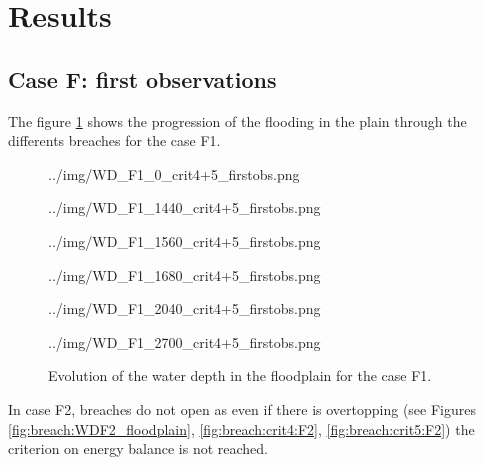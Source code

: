 \section{Results}
\subsection{Case F: first observations}
The figure \ref{fig:breach:WDF1_floodplain} shows the progression of the flooding
in the plain through the differents breaches for the case F1.
\begin{figure}[H]
\begin{minipage}[t]{0.5\textwidth}
  \centering
  {../img/WD_F1_0_crit4+5_firstobs.png}
\end{minipage}
\begin{minipage}[t]{0.5\textwidth}
  \centering
  {../img/WD_F1_1440_crit4+5_firstobs.png}\\
\end{minipage}
\begin{minipage}[t]{0.5\textwidth}
  \centering
  {../img/WD_F1_1560_crit4+5_firstobs.png}\\
\end{minipage}
\begin{minipage}[t]{0.5\textwidth}
  \centering
  {../img/WD_F1_1680_crit4+5_firstobs.png}\\
\end{minipage}
\begin{minipage}[t]{0.5\textwidth}
  \centering
  {../img/WD_F1_2040_crit4+5_firstobs.png}\\
\end{minipage}
\begin{minipage}[t]{0.5\textwidth}
  \centering
  {../img/WD_F1_2700_crit4+5_firstobs.png}
\end{minipage}
  \caption{Evolution of the water depth in the floodplain for the case F1.}
  \label{fig:breach:WDF1_floodplain}
\end{figure}
In case F2, breaches do not open as even if there is overtopping
(see Figures \ref{fig:breach:WDF2_floodplain}, \ref{fig:breach:crit4:F2},
\ref{fig:breach:crit5:F2}) the criterion on energy balance is not reached.
